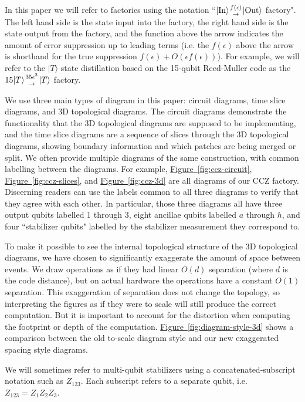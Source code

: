 \documentclass[superscriptaddress,notitlepage,longbibliography]{revtex4-1}
\newcommand{\fig}[1]{\hyperref[fig:#1]{Figure~\ref*{fig:#1}}}
\newcommand{\factory}[3]{$#1 \genfrac{}{}{0pt}{}{#2}{\rightarrow} {#3}$ factory}
\begin{document}
In this paper we will refer to factories using the notation ``\factory{|\text{In}\rangle}{f(\epsilon)}{|\text{Out}\rangle}".
The left hand side is the state input into the factory, the right hand side is the state output from the factory, and the function above the arrow indicates the amount of error suppression up to leading terms (i.e. the $f(\epsilon)$ above the arrow is shorthand for the true suppression $f(\epsilon) + O(\epsilon f(\epsilon))$).
For example, we will refer to the $|T\rangle$ state distillation based on the 15-qubit Reed-Muller code \cite{bravyi2005} as the \factory{15|T\rangle}{35 \epsilon^3}{|T\rangle}.

We use three main types of diagram in this paper: circuit diagrams, time slice diagrams, and 3D topological diagrams.
The circuit diagrams demonstrate the functionality that the 3D topological diagrams are supposed to be implementing, and the time slice diagrams are a sequence of slices through the 3D topological diagrams, showing boundary information and which patches are being merged or split.
We often provide multiple diagrams of the same construction, with common labelling between the diagrams.
For example, \fig{ccz-circuit}, \fig{ccz-slices}, and \fig{ccz-3d} are all diagrams of our CCZ factory.
Discerning readers can use the labels common to all three diagrams to verify that they agree with each other.
In particular, those three diagrams all have three output qubits labelled 1 through 3, eight ancillae qubits labelled $a$ through $h$, and four ``stabilizer qubits" labelled by the stabilizer measurement they correspond to.

To make it possible to see the internal topological structure of the 3D topological diagrams, we have chosen to significantly exaggerate the amount of space between events.
We draw operations as if they had linear $O(d)$ separation (where $d$ is the code distance), but on actual hardware the operations have a constant $O(1)$ separation.
This exaggeration of separation does not change the topology, so interpreting the figures as if they were to scale will still produce the correct computation.
But it is important to account for the distortion when computing the footprint or depth of the computation.
\fig{diagram-style-3d} shows a comparison between the old to-scale diagram style and our new exaggerated spacing style diagrams.

We will sometimes refer to multi-qubit stabilizers using a concatenated-subscript notation such as $Z_{123}$.
Each subscript refers to a separate qubit, i.e. $Z_{123} = Z_1 Z_2 Z_3$.
\end{document}
